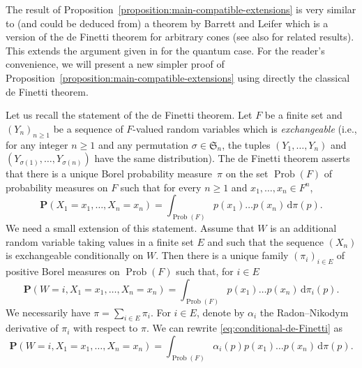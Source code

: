 \documentclass{amsart}
\newcommand{\iy}{\infty}
\DeclareMathOperator{\Prob}{Prob}
\renewcommand{\geq}{\geqslant}
\newcommand{\gC}{\mathsf{C}}
\renewcommand{\P}{\mathbf{P}}
\newcommand{\Ext}{\mathsf{Ext}}
\theoremstyle{plain}
\newcommand{\tmin}{{\otimes_{\min}}}
\newcommand{\out}[1]{\textcolor{red}{#1}}
\begin{document}


The result of Proposition~\ref{proposition:main-compatible-extensions} is very similar to (and could be deduced from) a theorem by Barrett and Leifer \cite{BarrettLeifer} which is a version of the de Finetti theorem for arbitrary cones (see also \cite{ChristandlToner09} for related results). This extends the argument given in \cite{CFS02} for the quantum case. For the reader's convenience, we will present a new simpler proof of Proposition~\ref{proposition:main-compatible-extensions} using directly the classical de Finetti theorem.

Let us recall the statement of the de Finetti theorem. Let $F$ be a finite set and $(Y_n)_{n \geq 1}$ be a sequence of $F$-valued random variables which is \emph{exchangeable} (i.e., for any integer $n \geq 1$ and any permutation $\sigma \in \mathfrak{S}_n$, the tuples $(Y_1,\dots,Y_n)$ and $(Y_{\sigma(1)},\dots,Y_{\sigma(n)})$ have the same distribution). The de Finetti theorem asserts that there is a unique Borel probability measure~$\pi$ on the set $\Prob(F)$ of probability measures on $F$ such that for every $n \geq 1$ and $x_1,\dots,x_n \in F^n$,
\[ \P(X_1=x_1,\dots,X_n=x_n) = \int_{\Prob(F)}  p(x_1)\dots p(x_n) \, \mathrm{d}\pi(p). 
\]
We need a small extension of this statement. Assume that $W$ is an additional random variable taking values in a finite set $E$ and such that the sequence $(X_n)$ is exchangeable conditionally on $W$. Then there is a unique family $(\pi_i)_{i \in E}$ of positive Borel measures on $\Prob(F)$ such that, for $i \in E$
\begin{equation} \label{eq:conditional-de-Finetti} \P(W=i,X_1=x_1,\dots,X_n=x_n)  = \int_{\Prob(F)}  p(x_1)\dots p(x_n) \, \mathrm{d}\pi_i(p). 
\end{equation}
We necessarily have $\pi = \sum_{i \in E} \pi_i$. For $i \in E$, denote by $\alpha_i$ the Radon--Nikodym derivative of $\pi_i$ with respect to $\pi$. We can rewrite \eqref{eq:conditional-de-Finetti} as
\begin{equation} \label{eq:conditional-de-Finetti2} \P(W=i,X_1=x_1,\dots,X_n=x_n)  = \int_{\Prob(F)} \alpha_i(p) p(x_1)\dots p(x_n) \, \mathrm{d}\pi(p). 
\end{equation}
\end{document}
